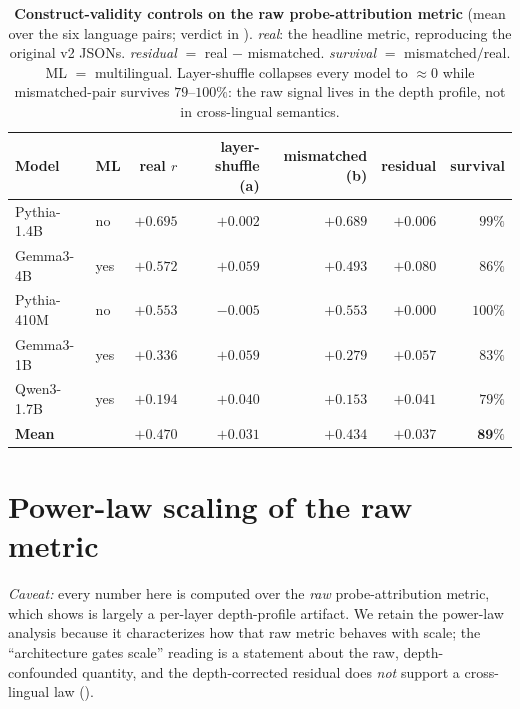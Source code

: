 \begin{table}[h]
\centering
\caption{\textbf{Construct-validity controls on the raw probe-attribution metric}
(mean over the six language pairs; verdict in ).
\emph{real}: the headline metric, reproducing the
original v2 JSONs. \emph{residual} $=$ real $-$ mismatched. \emph{survival}
$=$ mismatched$/$real. ML $=$ multilingual. Layer-shuffle collapses every model to
$\approx 0$ while mismatched-pair survives $79$--$100\%$: the raw signal lives in the
depth profile, not in cross-lingual semantics.}
\label{tab:construct_validity}
\small
\begin{tabular}{llrrrrr}
\toprule
Model & ML & real $r$ & layer-shuffle (a) & mismatched (b) & residual & survival \\
\midrule
Pythia-1.4B  & no  & $+0.695$ & $+0.002$ & $+0.689$ & $+0.006$ & $99\%$ \\
Gemma3-4B    & yes & $+0.572$ & $+0.059$ & $+0.493$ & $+0.080$ & $86\%$ \\
Pythia-410M  & no  & $+0.553$ & $-0.005$ & $+0.553$ & $+0.000$ & $100\%$ \\
Gemma3-1B    & yes & $+0.336$ & $+0.059$ & $+0.279$ & $+0.057$ & $83\%$ \\
Qwen3-1.7B   & yes & $+0.194$ & $+0.040$ & $+0.153$ & $+0.041$ & $79\%$ \\
\midrule
\textbf{Mean} & & $\mathbf{+0.470}$ & $\mathbf{+0.031}$ & $\mathbf{+0.434}$ & $\mathbf{+0.037}$ & $\mathbf{89\%}$ \\
\bottomrule
\end{tabular}
\end{table}

\section{Power-law scaling of the raw metric}\label{app:scaling}

\emph{Caveat:} every number here is computed over the \emph{raw} probe-attribution metric,
which  shows is largely a per-layer depth-profile
artifact. We retain the power-law analysis because it characterizes how that raw metric
behaves with scale; the ``architecture gates scale'' reading is a statement about the raw,
depth-confounded quantity, and the depth-corrected residual does \emph{not} support a
cross-lingual law ().

